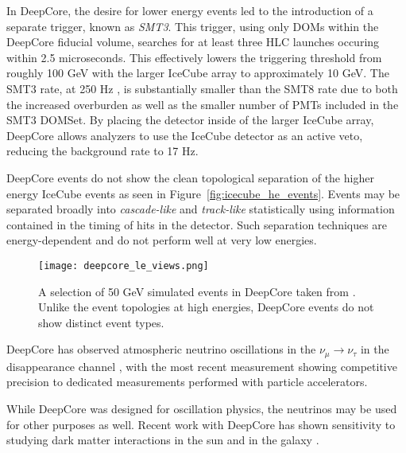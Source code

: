 In DeepCore, the desire for lower energy events led to the introduction of a separate trigger, known as \emph{SMT3}.
This trigger, using only DOMs within the DeepCore fiducial volume, searches for at least three HLC launches occuring within 2.5 microseconds.
This effectively lowers the triggering threshold from roughly 100 GeV with the larger IceCube array to approximately 10 GeV.
The SMT3 rate, at 250 Hz \cite{Description-IceCube, Description-DeepCore}, is substantially smaller than the SMT8 rate due to both the increased overburden as well as the smaller number of PMTs included in the SMT3 DOMSet.
By placing the detector inside of the larger IceCube array, DeepCore allows analyzers to use the IceCube detector as an active veto, reducing the background rate to 17 Hz.

DeepCore events do not show the clean topological separation of the higher energy IceCube events as seen in Figure~\ref{fig:icecube_he_events}.
Events may be separated broadly into \emph{cascade-like} and \emph{track-like} statistically using information contained in the timing of hits in the detector.
Such separation techniques are energy-dependent and do not perform well at very low energies.

\begin{figure}
\texttt{[image: deepcore\_le\_views.png]} 
\caption{A selection of 50 GeV simulated events in DeepCore taken from \cite{Thesis-Euler}. Unlike the event topologies at high energies, DeepCore events do not show distinct event types.}
\label{fig:deepcore_events}
\end{figure}

DeepCore has observed atmospheric neutrino oscillations in the $\nu_\mu \rightarrow \nu_\tau$ in the disappearance channel \cite{IceCube-Oscillation2013,IceCube-Oscillation2015,IceCube-Oscillation2018}, with the most recent measurement showing competitive precision to dedicated measurements performed with particle accelerators.

While DeepCore was designed for oscillation physics, the neutrinos may be used for other purposes as well. 
Recent work with DeepCore has shown sensitivity to studying dark matter interactions in the sun \cite{IceCube-LE-SolarDarkMatter} and in the galaxy \cite{IceCube-LE-GalacticDarkMatter}.


